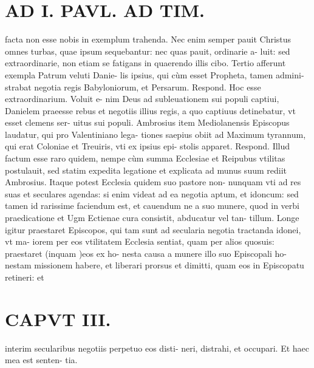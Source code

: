 \documentclass{article}
\begin{document}
\begin{pages}
\section*{AD I. PAVL. AD TIM. }
\marginpar{[ p.154 ]}\pstart facta non esse nobis in exemplum trahenda. Nec enim semper pauit Christus omnes turbas, quae ipsum sequebantur: nec quas pauit, ordinarie a- luit: sed extraordinarie, non etiam se fatigans in quaerendo illis cibo.  \pend\pstart Tertio afferunt exempla Patrum veluti Danie- lis ipsius, qui cùm esset Propheta, tamen admini- strabat negotia regis Babyloniorum, et Persarum. Respond. Hoc esse extraordinarium. Voluit e- nim Deus ad subleuationem sui populi captiui, Danielem praeesse rebus et negotiis illius regis, a quo captiuus detinebatur, vt esset clemens ser- uitus sui populi. Ambrosius item Mediolanensis Episcopus laudatur, qui pro Valentiniano lega- tiones saepius obiit ad Maximum tyrannum, qui erat Coloniae et Treuiris, vti ex ipsius epi- stolis apparet. Respond. Illud factum esse raro quidem, nempe cùm summa Ecclesiae et Reipubus  vtilitas postulauit, sed statim expedita legatione et explicata ad munus suum rediit Ambrosius. Itaque potest Ecclesia quidem suo pastore non- nunquam vti ad res suas et seculares agendas: si enim videat ad ea negotia aptum, et idoncum: sed tamen id rarissime faciendum est, et cauendum ne a suo munere, quod in verbi praedicatione et Ugm Ectienae cura consistit, abducatur vel tan- tillum. Longe igitur praestaret Episcopos, qui tam sunt ad secularia negotia tractanda idonei, vt ma- iorem per eos vtilitatem Ecclesia sentiat, quam per alios quosuis: praestaret (inquam )eos ex ho- nesta causa a munere illo suo Episcopali ho- nestam missionem habere, et liberari prorsus et dimitti, quam eos in Episcopatu retineri: et  \pend
\section*{CAPVT  III. }
\marginpar{[ p.153 ]}\pstart interim secularibus negotiis perpetuo eos disti- neri, distrahi, et occupari. Et haec mea est senten- tia.  \pend
{}
{}

\end{pages}
\end{document}

